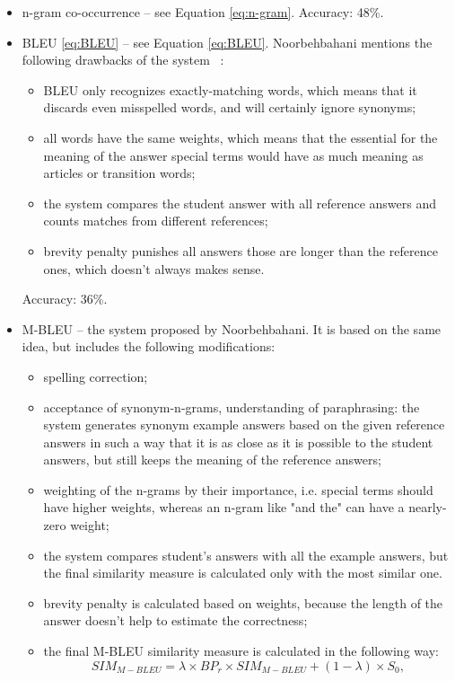 \begin{itemize}
\item n-gram co-occurrence -- see Equation \ref{eq:n-gram}. Accuracy: 48\%.
\item BLEU \ref{eq:BLEU} -- see Equation \ref{eq:BLEU}. Noorbehbahani mentions the following drawbacks of the system ~\cite{Noorbehbahani}:
\begin{itemize}
\item BLEU only recognizes exactly-matching words, which means that it discards even misspelled words, and will certainly ignore synonyms;
\item all words have the same weights, which means that the essential for the meaning of the answer special terms would have as much meaning as articles or transition words;
\item the system compares the student answer with all reference answers and counts matches from different references;
\item brevity penalty punishes all answers those are longer than the reference ones, which doesn't always makes sense.
\end{itemize}
Accuracy: 36\%.
\item M-BLEU -- the system proposed by Noorbehbahani. It is based on the same idea, but includes the following modifications:
\begin{itemize}
\item spelling correction;
\item acceptance of synonym-n-grams, understanding of paraphrasing: the system generates synonym example answers based on the given reference answers in such a way that it is as close as it is possible to the student answers, but still keeps the meaning of the reference answers;
\item weighting of the n-grams by their importance, i.e. special terms should have higher weights, whereas an n-gram like "and the" can have a nearly-zero weight;
\item the system compares student's answers with all the example answers, but the final similarity measure is calculated only with the most similar one.
\item brevity penalty is calculated based on weights, because the length of the answer doesn't help to estimate the correctness;
\item the final M-BLEU similarity measure is calculated in the following way:
\begin{equation} \label{eq:M-BLEU}
SIM_{M-BLEU} = \lambda \times BP_r \times SIM_{M-BLEU} + (1 - \lambda) \times S_0,

\end{equation}
\end{itemize}
\end{itemize}
